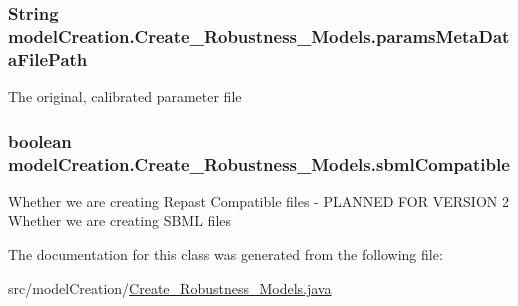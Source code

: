\subsubsection[{params\+Meta\+Data\+File\+Path}]{\setlength{\rightskip}{0pt plus 5cm}String model\+Creation.\+Create\+\_\+\+Robustness\+\_\+\+Models.\+params\+Meta\+Data\+File\+Path}\label{classmodelCreation_1_1Create__Robustness__Models_ad8c3635432767fd3c64c2dacc45b092d}
The original, calibrated parameter file \hypertarget{classmodelCreation_1_1Create__Robustness__Models_aff768751c3612fdc9b5afc935c0abe17}{}
\subsubsection[{sbml\+Compatible}]{\setlength{\rightskip}{0pt plus 5cm}boolean model\+Creation.\+Create\+\_\+\+Robustness\+\_\+\+Models.\+sbml\+Compatible}\label{classmodelCreation_1_1Create__Robustness__Models_aff768751c3612fdc9b5afc935c0abe17}
Whether we are creating Repast Compatible files -\/ P\+L\+A\+N\+N\+E\+D F\+O\+R V\+E\+R\+S\+I\+O\+N 2 Whether we are creating S\+B\+M\+L files 

The documentation for this class was generated from the following file\+:\begin{DoxyCompactItemize}
\item 
src/model\+Creation/\hyperlink{Create__Robustness__Models_8java}{Create\+\_\+\+Robustness\+\_\+\+Models.\+java}\end{DoxyCompactItemize}
